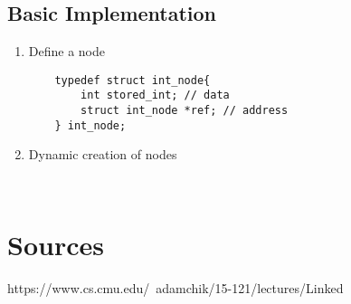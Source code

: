 \documentclass[hidelinks,11pt]{article}
\begin{document}
\subsection{Basic Implementation}
\begin{enumerate}
    \item Define a node
    \begin{lstlisting}
    typedef struct int_node{
        int stored_int; // data
        struct int_node *ref; // address
    } int_node;
    \end{lstlisting}
    \item Dynamic creation of nodes
    \begin{lstlisting}
    
    \end{lstlisting}
\end{enumerate}





\section{Sources}
https://www.cs.cmu.edu/~adamchik/15-121/lectures/Linked%
\end{document}
